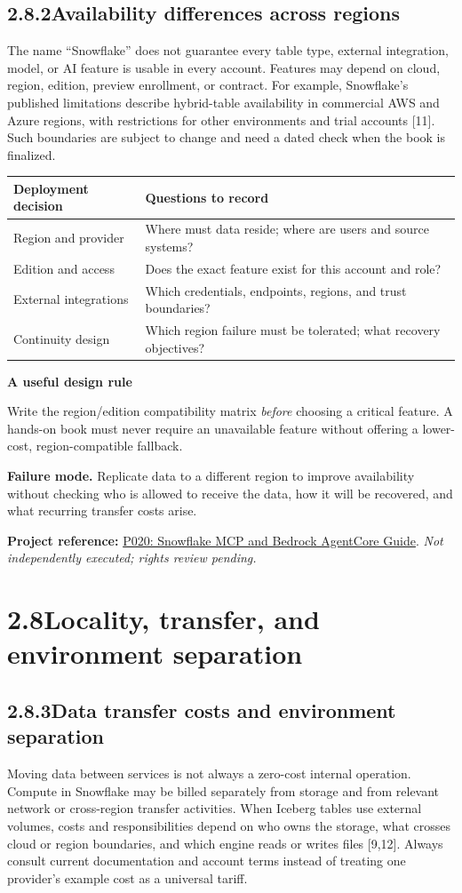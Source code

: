 \documentclass[11pt,twoside]{article}
\newcommand{\topic}[2]{\subsection*{#1\quad #2}}
\newcommand{\repo}[2]{\par\begingroup\fontsize{8.0}{9.6}\selectfont\sffamily\color{inkgray}\textbf{Project reference:} \href{#2}{#1}. \textit{Not independently executed; rights review pending.}\par\endgroup}
\begin{document}
\topic{2.8.2}{Availability differences across regions}
The name ``Snowflake'' does not guarantee every table type, external integration, model, or AI feature is usable in every account. Features may depend on cloud, region, edition, preview enrollment, or contract. For example, Snowflake's published limitations describe hybrid-table availability in commercial AWS and Azure regions, with restrictions for other environments and trial accounts [11]. Such boundaries are subject to change and need a dated check when the book is finalized.

\begin{center}\small
\begin{tabularx}{\linewidth}{@{}p{35mm}X@{}}\toprule
\textbf{Deployment decision} & \textbf{Questions to record}\\\midrule
Region and provider & Where must data reside; where are users and source systems?\\
Edition and access & Does the exact feature exist for this account and role?\\
External integrations & Which credentials, endpoints, regions, and trust boundaries?\\
Continuity design & Which region failure must be tolerated; what recovery objectives?\\
\bottomrule\end{tabularx}\end{center}

\begin{insight}
\textbf{A useful design rule}\par
Write the region/edition compatibility matrix \emph{before} choosing a critical feature. A hands-on book must never require an unavailable feature without offering a lower-cost, region-compatible fallback.
\end{insight}
\textbf{Failure mode.} Replicate data to a different region to improve availability without checking who is allowed to receive the data, how it will be recovered, and what recurring transfer costs arise.
\repo{P020: Snowflake MCP and Bedrock AgentCore Guide}{https://github.com/Snowflake-Labs/sfguide-getting-started-with-snowflake-managed-mcp-and-bedrock-agentcore}

\newpage
\section*{2.8\quad Locality, transfer, and environment separation}
\topic{2.8.3}{Data transfer costs and environment separation}
Moving data between services is not always a zero-cost internal operation. Compute in Snowflake may be billed separately from storage and from relevant network or cross-region transfer activities. When Iceberg tables use external volumes, costs and responsibilities depend on who owns the storage, what crosses cloud or region boundaries, and which engine reads or writes files [9,12]. Always consult current documentation and account terms instead of treating one provider's example cost as a universal tariff.
\end{document}
